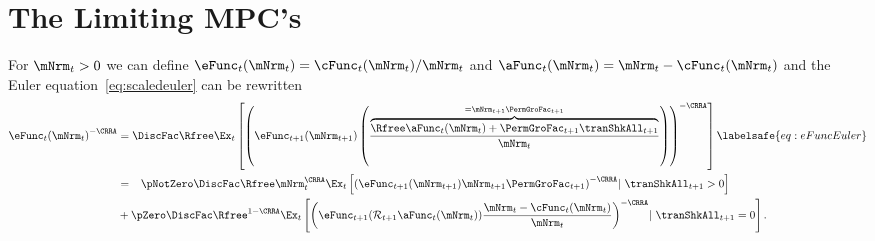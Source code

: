 \documentclass[\econtexRoot/BufferStockTheory]{subfiles}
\begin{document}
\hypertarget{The-Limiting-MPCs}{}
\section{The Limiting MPC's}\label{sec:MPCLimits}

For $\mNrm_{t}>0$ we can define $\eFunc_{t}(\mNrm_{t})=\cFunc_{t}(\mNrm_{t})/\mNrm_{t}$ and $\aFunc_{t}(\mNrm_{t})=\mNrm_{t}-\cFunc_{t}(\mNrm_{t})$ and the Euler equation~\eqref{eq:scaledeuler} can be rewritten
\begin{equation}\begin{gathered}\begin{aligned}
 \eFunc_{t}{(\mNrm_{t})}^{-\CRRA}  & = \DiscFac \Rfree \Ex_{t}\left[{\left(\eFunc_{t+1}({\mNrm}_{t+1})\left(\frac{\overbrace{\Rfree \aFunc_{t}(\mNrm_{t})+{\PermGroFac}_{t+1}{\tranShkAll}_{t+1}}^{=\mNrm_{t+1}\PermGroFac_{t+1}}}{\mNrm_{t}}\right)\right)}^{-\CRRA }\right] \labelsafe{eq:eFuncEuler}
\\  & = \phantom{ + }\pNotZero \DiscFac \Rfree \mNrm_{t}^{\CRRA} \Ex_{t}\left[ {\left(\eFunc_{t+1}(\mNrm_{t+1}) \mNrm_{t+1}\PermGroFac_{t+1}\right)}^{-\CRRA} |~ \tranShkAll_{t+1}>0 \right] \notag
\\ &  + \pZero  \DiscFac \Rfree^{1-\CRRA} \Ex_{t}\left[{\left(\eFunc_{t+1}(\mathcal{R}_{t+1}\aFunc_{t}(\mNrm_{t}))\frac{\mNrm_t-\cFunc_{t}(\mNrm_{t})}{\mNrm_{t}}\right)}^{-\CRRA} |~ \tranShkAll_{t+1} = 0 \right]   .
\end{aligned}\end{gathered}\end{equation}
\end{document}
